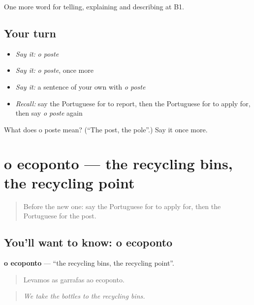 \begin{grammarlens}[title={What you've built}]
One more word for telling, explaining and describing at B1.
\end{grammarlens}

\subsection*{Your turn}
\begin{itemize}
\raggedright
  \item \emph{Say it:} \emph{o poste}
  \item \emph{Say it:} \emph{o poste}, once more
  \item \emph{Say it:} a sentence of your own with \emph{o poste}
  \item \emph{Recall:} say the Portuguese for to report, then the Portuguese for to apply for, then say \emph{o poste} again
\end{itemize}

\begin{tcolorbox}[breakable,colback=teal!4,colframe=teal!35!black,title={Before you move on}]
What does o poste mean? (\textquotedblleft{}The post, the pole\textquotedblright{}.) Say it once more.
\end{tcolorbox}
\section[o ecoponto]{o ecoponto — the recycling bins, the recycling point}

\label{lesson:PT-C444-ecoponto}



\begin{quote}
Before the new one: say the Portuguese for to apply for, then the Portuguese for the post.
\end{quote}

\subsection*{You'll want to know: o ecoponto}
\textbf{o ecoponto} — \textquotedblleft{}the recycling bins, the recycling point\textquotedblright{}.

\begin{quote}
Levamos as garrafas ao ecoponto.
\end{quote}

\begin{quote}
\emph{We take the bottles to the recycling bins.}
\end{quote}

